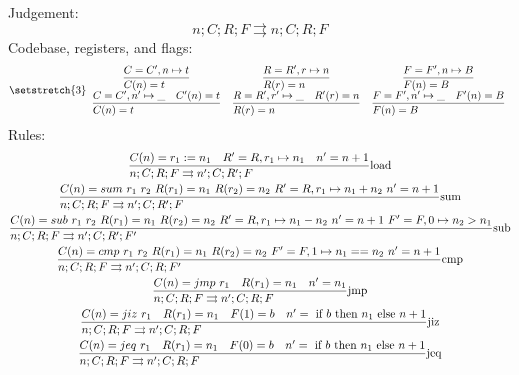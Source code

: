 \documentclass{article}
\newcommand{\execs}[0]{\ensuremath{\rightrightarrows}}
\begin{document}
Judgement:
\begin{equation*}
    n;C;R;F \rightrightarrows n;C;R;F
\end{equation*}
Codebase, registers, and flags:
\[\setstretch{3} \begin{array}{ccc}
    \st[]{C(n)=t}{C=C',n\mapsto t} &
    \st[]{R(r)=n}{R=R',r\mapsto n} &
    \st[]{F(n)=B}{F=F',n\mapsto B} \\
    \st[]{C(n)=t}{C=C',n'\mapsto \_\quad C'(n)=t} &
    \st[]{R(r)=n}{R=R',r'\mapsto \_\quad R'(r)=n} &
    \st[]{F(n)=B}{F=F',n'\mapsto \_\quad F'(n)=B} \\
\end{array}\]
Rules:
\begin{gather*}
    \st[load]{n;C;R;F \execs n';C;R';F}{C(n)=r_1:=n_1 \quad R'=R,r_1\mapsto n_1 \quad n'=n+1} \\
    \st[sum]{n;C;R;F \execs n';C;R';F}{
        C(n)=sum\ r_1\ r_2 \ 
        R(r_1)=n_1 \ 
        R(r_2)=n_2 \ 
        R'=R,r_1\mapsto n_1+n_2 \ 
        n'=n+1
    } \\
    \st[sub]{n;C;R;F \execs n';C;R';F'}{
        C(n)=sub\ r_1\ r_2 \ 
        R(r_1)=n_1 \ 
        R(r_2)=n_2 \ 
        R'=R,r_1\mapsto n_1-n_2 \ 
        n'=n+1 \
        F'=F,0\mapsto n_2>n_1
    } \\
    \st[cmp]{n;C;R;F \execs n';C;R;F'}{
        C(n)=cmp\ r_1\ r_2 \ 
        R(r_1)=n_1 \ 
        R(r_2)=n_2 \ 
        F'=F,1\mapsto n_1==n_2 \
        n'=n+1
    } \\
    \st[jmp]{n;C;R;F \execs n';C;R;F}{
        C(n)=jmp\ r_1 \quad
        R(r_1)=n_1 \quad
        n'=n_1
    } \\
    \st[jiz]{n;C;R;F \execs n';C;R;F}{
        C(n)=jiz\ r_1 \quad
        R(r_1)=n_1 \quad
        F(1)=b \quad
        n'=\IF b \THEN n_1 \ELSE n+1
    } \\
    \st[jeq]{n;C;R;F \execs n';C;R;F}{
        C(n)=jeq\ r_1 \quad
        R(r_1)=n_1 \quad
        F(0)=b \quad
        n'=\IF b \THEN n_1 \ELSE n+1
    } \\
\end{gather*}

\newpage
\end{document}
